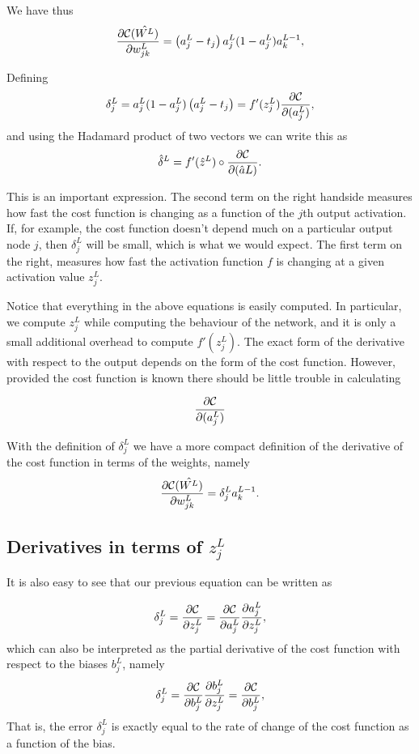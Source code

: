 \documentclass[%
oneside,                 %
final,                   %
10pt]{article}
\begin{document}
We have thus
\[
\frac{\partial{\cal C}(\hat{W^L})}{\partial w_{jk}^L}  =  \left(a_j^L - t_j\right)a_j^L(1-a_j^L)a_k^{L-1}, 
\]

Defining
\[
\delta_j^L = a_j^L(1-a_j^L)\left(a_j^L - t_j\right) = f'(z_j^L)\frac{\partial {\cal C}}{\partial (a_j^L)},
\]
and using the Hadamard product of two vectors we can write this as
\[
\hat{\delta}^L = f'(\hat{z}^L)\circ\frac{\partial {\cal C}}{\partial (\hat{a}L)}.
\]

This is an important expression. The second term on the right handside
measures how fast the cost function is changing as a function of the $j$th
output activation.  If, for example, the cost function doesn't depend
much on a particular output node $j$, then $\delta_j^L$ will be small,
which is what we would expect. The first term on the right, measures
how fast the activation function $f$ is changing at a given activation
value $z_j^L$.

Notice that everything in the above equations is easily computed.  In
particular, we compute $z_j^L$ while computing the behaviour of the
network, and it is only a small additional overhead to compute
$f'(z^L_j)$.  The exact form of the derivative with respect to the
output depends on the form of the cost function.
However, provided the cost function is known there should be little
trouble in calculating

\[
\frac{\partial {\cal C}}{\partial (a_j^L)}
\]

With the definition of $\delta_j^L$ we have a more compact definition of the derivative of the cost function in terms of the weights, namely
\[
\frac{\partial{\cal C}(\hat{W^L})}{\partial w_{jk}^L}  =  \delta_j^La_k^{L-1}.
\]

\subsection{Derivatives in terms of $z_j^L$}

It is also easy to see that our previous equation can be written as

\[
\delta_j^L =\frac{\partial {\cal C}}{\partial z_j^L}= \frac{\partial {\cal C}}{\partial a_j^L}\frac{\partial a_j^L}{\partial z_j^L},
\]
which can also be interpreted as the partial derivative of the cost function with respect to the biases $b_j^L$, namely
\[
\delta_j^L = \frac{\partial {\cal C}}{\partial b_j^L}\frac{\partial b_j^L}{\partial z_j^L}=\frac{\partial {\cal C}}{\partial b_j^L},
\]
That is, the error $\delta_j^L$ is exactly equal to the rate of change of the cost function as a function of the bias. 
\end{document}
